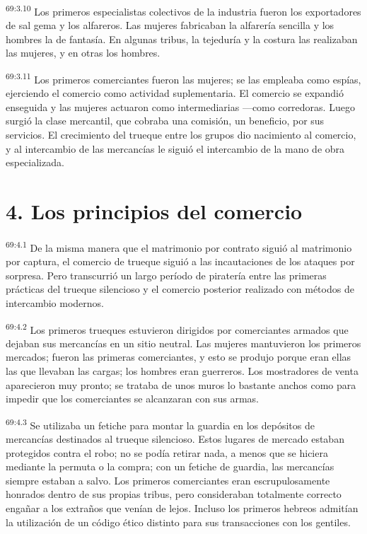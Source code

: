 \par
\textsuperscript{69:3.10} Los primeros especialistas colectivos de la industria fueron los exportadores de sal gema y los alfareros. Las mujeres fabricaban la alfarería sencilla y los hombres la de fantasía. En algunas tribus, la tejeduría y la costura las realizaban las mujeres, y en otras los hombres.

\par
\textsuperscript{69:3.11} Los primeros comerciantes fueron las mujeres; se las empleaba como espías, ejerciendo el comercio como actividad suplementaria. El comercio se expandió enseguida y las mujeres actuaron como intermediarias ---como corredoras. Luego surgió la clase mercantil, que cobraba una comisión, un beneficio, por sus servicios. El crecimiento del trueque entre los grupos dio nacimiento al comercio, y al intercambio de las mercancías le siguió el intercambio de la mano de obra especializada.

\section*{4. Los principios del comercio}
\par
\textsuperscript{69:4.1} De la misma manera que el matrimonio por contrato siguió al matrimonio por captura, el comercio de trueque siguió a las incautaciones de los ataques por sorpresa. Pero transcurrió un largo período de piratería entre las primeras prácticas del trueque silencioso y el comercio posterior realizado con métodos de intercambio modernos.

\par
\textsuperscript{69:4.2} Los primeros trueques estuvieron dirigidos por comerciantes armados que dejaban sus mercancías en un sitio neutral. Las mujeres mantuvieron los primeros mercados; fueron las primeras comerciantes, y esto se produjo porque eran ellas las que llevaban las cargas; los hombres eran guerreros. Los mostradores de venta aparecieron muy pronto; se trataba de unos muros lo bastante anchos como para impedir que los comerciantes se alcanzaran con sus armas.

\par
\textsuperscript{69:4.3} Se utilizaba un fetiche para montar la guardia en los depósitos de mercancías destinados al trueque silencioso. Estos lugares de mercado estaban protegidos contra el robo; no se podía retirar nada, a menos que se hiciera mediante la permuta o la compra; con un fetiche de guardia, las mercancías siempre estaban a salvo. Los primeros comerciantes eran escrupulosamente honrados dentro de sus propias tribus, pero consideraban totalmente correcto engañar a los extraños que venían de lejos. Incluso los primeros hebreos admitían la utilización de un código ético distinto para sus transacciones con los gentiles.

